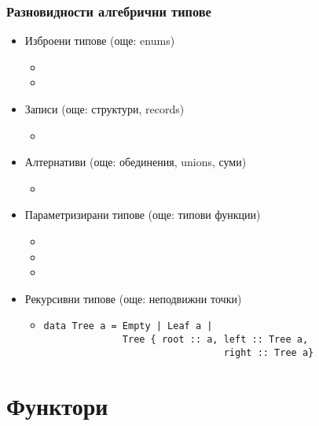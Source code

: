 \documentclass[alsotrans]{beamerswitch}
\begin{document}
\begin{frame}[fragile]
  \frametitle{Разновидности алгебрични типове}
  \small
  \begin{itemize}[<+->]
  \item Изброени типове (още: enums)
    \begin{itemize}
    \item {}
    \item {}
    \end{itemize}
  \item Записи (още: структури, records)
    \begin{itemize}
    \item {}
    \end{itemize}
  \item Алтернативи (още: обединения, unions, суми)
    \begin{itemize}
    \item {}
    \end{itemize}
  \item Параметризирани типове (още: типови функции)
    \begin{itemize}
    \item {}
    \item {}
    \item {}
    \end{itemize}
  \item Рекурсивни типове (още: неподвижни точки)
    \vspace{-1ex}
    \begin{itemize}
    \item
\begin{lstlisting}
data Tree a = Empty | Leaf a |
              Tree { root :: a, left :: Tree a,
                                right :: Tree a}
\end{lstlisting}
    \end{itemize}
  \end{itemize}
\end{frame}

\section{Функтори}
\end{document}

